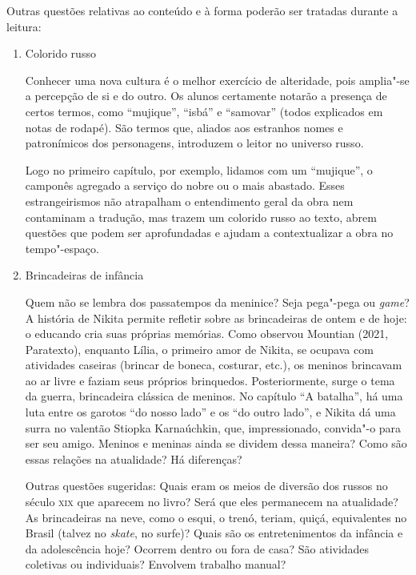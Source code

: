 \documentclass[11pt]{extarticle}
\begin{document}
Outras questões relativas ao conteúdo e à forma poderão ser tratadas durante a leitura:

\begin{enumerate}
\item
Colorido russo

Conhecer uma nova cultura é o melhor exercício de alteridade, pois
amplia"-se a percepção de si e do outro. Os alunos certamente notarão a
presença de certos termos, como ``mujique'', ``isbá'' e ``samovar''
(todos explicados em notas de rodapé). São termos que, aliados aos
estranhos nomes e patronímicos dos personagens, introduzem o leitor no
universo russo.


Logo no primeiro capítulo, por exemplo, lidamos com um ``mujique'', o
camponês agregado a serviço do nobre ou o mais abastado. Esses
estrangeirismos não atrapalham o entendimento geral da obra nem
contaminam a tradução, mas trazem um colorido russo ao texto, abrem
questões que podem ser aprofundadas e ajudam a contextualizar a obra no
tempo"-espaço.


\item
Brincadeiras de infância

Quem não se lembra dos passatempos da meninice? Seja pega"-pega ou
\emph{game}? A história de Nikita permite refletir sobre as brincadeiras
de ontem e de hoje: o educando cria suas próprias memórias. Como
observou Mountian (2021, Paratexto), enquanto Lília, o primeiro amor de
Nikita, se ocupava com atividades caseiras (brincar de boneca, costurar,
etc.), os meninos brincavam ao ar livre e faziam seus próprios
brinquedos. Posteriormente, surge o
tema da guerra, brincadeira clássica de meninos. No capítulo ``A
batalha'', há uma luta entre os garotos ``do nosso lado'' e os ``do
outro lado'', e Nikita dá uma surra no valentão Stiopka Karnaúchkin,
que, impressionado, convida"-o para ser seu amigo. Meninos e meninas ainda se
dividem dessa maneira? Como são essas relações na atualidade? Há diferenças? 

Outras questões sugeridas: Quais eram os meios de diversão dos russos
no século \textsc{xix} que aparecem no livro? Será que eles permanecem na
atualidade? As brincadeiras na neve, como o esqui, o trenó, teriam,
quiçá, equivalentes no Brasil (talvez no \emph{skate}, no surfe)? Quais
são os entretenimentos da infância e da adolescência hoje? Ocorrem
dentro ou fora de casa? São atividades coletivas ou individuais?
Envolvem trabalho manual?


\end{enumerate}
\end{document}
